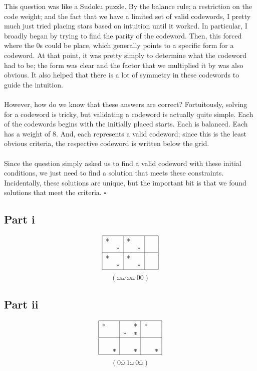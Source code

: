 \documentclass[letterpaper]{article}
\newcommand*{\QED}{\hfill\ensuremath{\square}}%
\begin{document}
This question was like a Sudoku puzzle.
By the balance rule; a restriction on the code weight; and the fact that we have a limited set of valid codewords, I pretty much just tried placing stars based on intuition until it worked.
In particular, I broadly began by trying to find the parity of the codeword.
Then, this forced where the $ 0 $s could be place, which generally points to a specific form for a codeword.
At that point, it was pretty simply to determine what the codeword had to be; the form was clear and the factor that we multiplied it by was also obvious.
It also helped that there is a lot of symmetry in these codewords to guide the intuition.
\\ \\
However, how do we know that these answers are correct?
Fortuitously, solving for a codeword is tricky, but validating a codeword is actually quite simple.
Each of the codewords begins with the initially placed starts.
Each is balanced.
Each has a weight of $ 8 $.
And, each represents a valid codeword; since this is the least obvious criteria, the respective codeword is written below the grid.
\\ \\
Since the question simply asked us to find a valid codeword with these initial conditions, we just need to find a solution that meets these constraints.
Incidentally, these solutions are unique, but the important bit is that we found solutions that meet the criteria.
\QED{}

\subsection{Part i}
\label{subs:5Parti}

\[
\begin{array}{|c c|c c|c c|}
\hline
* &   & * &   &   &   \\
  & * &   & * &   &   \\
\hline
* &   & * &   &   &   \\
  & * &   & * &   &   \\
\hline
\end{array}
\]
\[
(\omega \omega \, \omega \omega \, 0 0)
\]

\subsection{Part ii}
\label{subs:5Partii}

\[
\begin{array}{|c c|c c|c c|}
\hline
* &   &   & * & * &   \\
  &   & * & * &   &   \\
\hline
  &   &   &   &   &   \\
  & * &   & * &   & * \\
\hline
\end{array}
\]
\[
(0 \overline{\omega} \, 1 \omega \, 0 \overline{\omega})
\]
\end{document}
